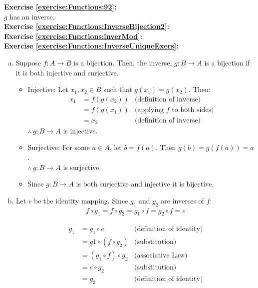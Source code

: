 \noindent\textbf{Exercise \ref{exercise:Functions:92}:}\\
$g$ has an inverse.\\

\noindent\textbf{Exercise \ref{exercise:Functions:InverseBijection2}:}\\

\noindent\textbf{Exercise \ref{exercise:Functions:inverMod}:}\\

\noindent\textbf{Exercise \ref{exercise:Functions:InverseUniqueExers}:} %
\begin{enumerate}[(a)]
\item \label{InverseUniqueExers-bij}
Suppose $f\colon A\to B$ is a bijection. Then, the inverse, $g\colon B\to A$ is a bijection if it is both injective and surjective.\\
	\begin{itemize}
	\item 
	Injective: Let $x_{1},x_{2}\in B$ such that $g(x_{1}) = g(x_{2})$. Then:
	\begin{align*}
	x_{1} &= f(g(x_{2})) &\text{(definition of inverse)}\\
	&= f(g(x_{1})) &\text{(applying $f$ to both sides)}\\
	&= x_{2} &\text{(definition of inverse)}
	\end{align*}
	$\therefore\ g:B\to A$ is injective.

	\item 
	Surjective: For some $a\in A$, let $b = f(a)$. Then $g(b) = g(f(a)) = a$.\\
	$\therefore\ g\colon B\to A$ is surjective.
            
	\item
	Since $g\colon B\to A$ is both surjective and injective it is bijective.
	\end{itemize}
	
\item \label{InverseUniqueExers-unique}
Let $e$ be the identity mapping. Since $g_{1}$ and $g_{2}$ are inverses of $f$:
\begin{align*}
f\circ g_{1} = f\circ g_{2} = g_{1}\circ f = g_{2}\circ f = e
\end{align*}
        
\begin{align*}
g_{1} &= g_{1}\circ e &\text{(definition of identity)}\\
&= g{1}\circ (f\circ g_{2}) &\text{(substitution)}\\
&= (g_{1}\circ f)\circ g_{2} &\text{(associative Law)}\\
&= e\circ g_{2} &\text{(substitution)}\\
&= g_{2} &\text{(definition of identity)}
\end{align*}
\end{enumerate}


